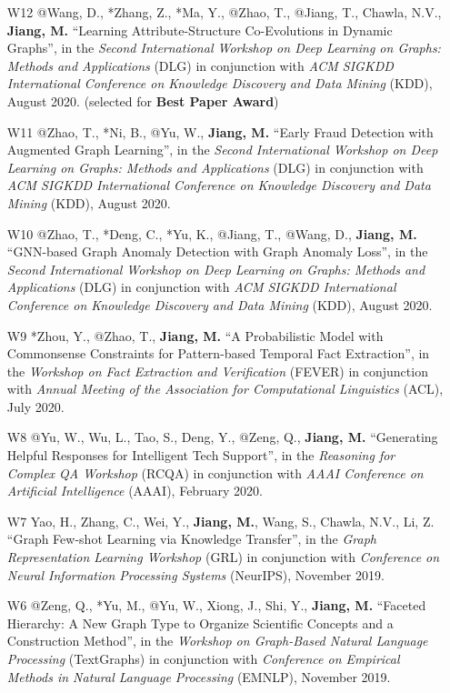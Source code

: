 \documentclass[10pt]{article}
\newenvironment{myindentpar}[1]%
{\begin{list}{}%
         {\setlength{\leftmargin}{#1}}%
         \item[]%
}
{\end{list}}
\newcounter{list}
\begin{document}
\begin{myindentpar}{0.00cm}
\begin{enumerate}[leftmargin=.5cm]
\item[W12] @Wang, D., *Zhang, Z., *Ma, Y., @Zhao, T., @Jiang, T., Chawla, N.V., \textbf{Jiang, M.} ``Learning Attribute-Structure Co-Evolutions in Dynamic Graphs'', in the \textit{Second International Workshop on Deep Learning on Graphs: Methods and Applications} (DLG) in conjunction with \textit{ACM SIGKDD International Conference on Knowledge Discovery and Data Mining} (KDD), August 2020. (selected for \textbf{Best Paper Award})

\item[W11] @Zhao, T., *Ni, B., @Yu, W., \textbf{Jiang, M.} ``Early Fraud Detection with Augmented Graph Learning'', in the \textit{Second International Workshop on Deep Learning on Graphs: Methods and Applications} (DLG) in conjunction with \textit{ACM SIGKDD International Conference on Knowledge Discovery and Data Mining} (KDD), August 2020.

\item[W10] @Zhao, T., *Deng, C., *Yu, K., @Jiang, T., @Wang, D., \textbf{Jiang, M.} ``GNN-based Graph Anomaly Detection with Graph Anomaly Loss'', in the \textit{Second International Workshop on Deep Learning on Graphs: Methods and Applications} (DLG) in conjunction with \textit{ACM SIGKDD International Conference on Knowledge Discovery and Data Mining} (KDD), August 2020.

\item[W9] *Zhou, Y., @Zhao, T., \textbf{Jiang, M.} ``A Probabilistic Model with Commonsense Constraints for Pattern-based Temporal Fact Extraction'', in the \textit{Workshop on Fact Extraction and Verification} (FEVER) in conjunction with \textit{Annual Meeting of the Association for Computational Linguistics} (ACL), July 2020.

\item[W8] @Yu, W., Wu, L., Tao, S., Deng, Y., @Zeng, Q., \textbf{Jiang, M.} ``Generating Helpful Responses for Intelligent Tech Support'', in the \textit{Reasoning for Complex QA  Workshop} (RCQA) in conjunction with \textit{AAAI Conference on Artificial Intelligence} (AAAI), February 2020.

\item[W7] Yao, H., Zhang, C., Wei, Y., \textbf{Jiang, M.}, Wang, S., Chawla, N.V., Li, Z. ``Graph Few-shot Learning via Knowledge Transfer'', in the \textit{Graph Representation Learning Workshop} (GRL) in conjunction with \textit{Conference on Neural Information Processing Systems} (NeurIPS), November 2019.
	
\item[W6] @Zeng, Q., *Yu, M., @Yu, W., Xiong, J., Shi, Y., \textbf{Jiang, M.} ``Faceted Hierarchy: A New Graph Type to Organize Scientific Concepts and a Construction Method'', in the \textit{Workshop on Graph-Based Natural Language Processing} (TextGraphs) in conjunction with \textit{Conference on Empirical Methods in Natural Language Processing} (EMNLP), November 2019.


\end{enumerate}
\end{myindentpar}
\end{document}
